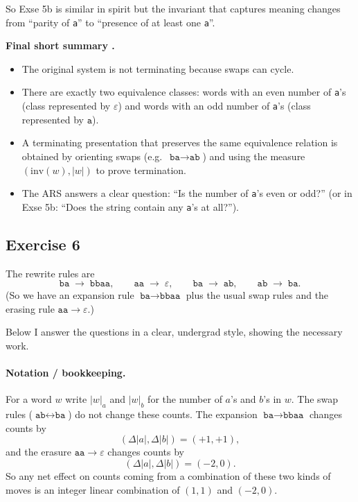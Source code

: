 \documentclass[12pt]{article}
\begin{document}
So Exse 5b is similar in spirit but the invariant that captures meaning changes from ``parity of \texttt{a}'' to ``presence of at least one \texttt{a}''.

\bigskip

\textbf{Final short summary .}
\begin{itemize}
  \item The original system is not terminating because swaps can cycle.
  \item There are exactly two equivalence classes: words with an even number of \texttt{a}'s (class represented by \(\varepsilon\)) and words with an odd number of \texttt{a}'s (class represented by \(\texttt{a}\)).
  \item A terminating presentation that preserves the same equivalence relation is obtained by orienting swaps (e.g.\ \(\texttt{ba}\to\texttt{ab}\)) and using the measure \((\mathrm{inv}(w),|w|)\) to prove termination.
  \item The ARS answers a clear question: ``Is the number of \texttt{a}'s even or odd?'' (or in Exse 5b: ``Does the string contain any \texttt{a}'s at all?'').
\end{itemize}

\subsection*{Exercise 6}

The rewrite rules are
\[
\texttt{ba}\;\to\;\texttt{bbaa},\qquad
\texttt{aa}\;\to\;\varepsilon,\qquad
\texttt{ba}\;\to\;\texttt{ab},\qquad
\texttt{ab}\;\to\;\texttt{ba}.
\]
(So we have an expansion rule \(\texttt{ba}\to\texttt{bbaa}\) plus the usual swap rules and the erasing rule \(\texttt{aa}\to\varepsilon\).)

\bigskip

Below I answer the questions in a clear, undergrad style, showing the necessary work.

\paragraph{Notation / bookkeeping.}  
For a word \(w\) write \(|w|_a\) and \(|w|_b\) for the number of \(a\)'s and \(b\)'s in \(w\). The swap rules (\(\texttt{ab}\leftrightarrow\texttt{ba}\)) do not change these counts. The expansion \(\texttt{ba}\to\texttt{bbaa}\) changes counts by
\[
(\Delta|a|,\Delta|b|)=(+1,+1),
\]
and the erasure \(\texttt{aa}\to\varepsilon\) changes counts by
\[
(\Delta|a|,\Delta|b|)=(-2,0).
\]
So any net effect on counts coming from a combination of these two kinds of moves is an integer linear combination of \((1,1)\) and \((-2,0)\).
\end{document}
